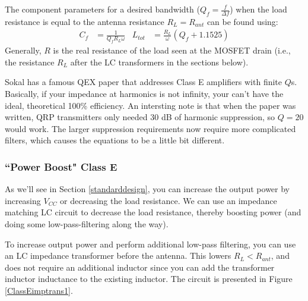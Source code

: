 \documentclass[10pt,letterpaper]{article}
\begin{document}
The component parameters for a desired bandwidth ($Q_f=\frac{f}{\Delta f}$) when the load resistance is equal to the antenna resistance $R_L=R_{ant}$ can be found using:
\begin{align*}
C_f &=\frac{1}{Q_f R_L \omega} &
L_{tot} & =\frac{R_L}{\omega}\left(Q_f+1.1525\right)
\end{align*}
Generally, $R$ is the real resistance of the load seen at the MOSFET drain  (i.e., the resistance $R_L$ after the LC transformers in the sections below).

Sokal has a famous QEX paper that addresses Class E amplifiers with finite $Q$s. Basically, if your impedance at harmonics is not infinity, your can't have the ideal, theoretical 100\% efficiency. An intersting note is that when the paper was written, QRP transmitters only needed 30 dB of harmonic suppression, so $Q=20$ would work. The larger suppression requirements now require more complicated filters, which causes the equations to be a little bit different.

\subsubsection{``Power Boost" Class E}
As we'll see in Section \ref{standarddesign}, you can increase the output power by increasing $V_{CC}$ or decreasing the load resistance. We can use an impedance matching LC circuit to decrease the load resistance, thereby boosting power (and doing some low-pass-filtering along the way).

To increase output power and perform additional low-pass filtering, you can use an LC impedance transformer before the antenna. This lowers $R_L<R_{ant}$, and does not require an additional inductor since you can add the transformer inductor inductance to the existing inductor. The circuit is presented in Figure \ref{ClassEimptrans1}.
\end{document}
